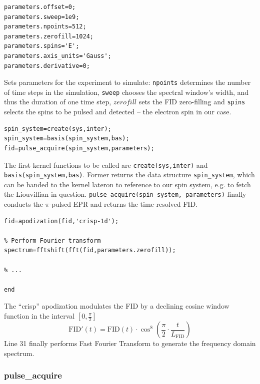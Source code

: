 \documentclass[11.5pt,a4paper]{article}
\begin{document}
\begin{lstlisting}[firstnumber=last]
% Set the sequence parameters
parameters.offset=0;
parameters.sweep=1e9;
parameters.npoints=512;
parameters.zerofill=1024;
parameters.spins='E';
parameters.axis_units='Gauss';
parameters.derivative=0;
\end{lstlisting}
Sets parameters for the experiment to simulate: \verb$npoints$ determines the number of time steps in the simulation, \verb$sweep$ chooses the spectral window's width, and thus the duration of one time step, $zerofill$ sets the FID zero-filling and \verb$spins$ selects the spins to be pulsed and detected -- the electron spin in our case.
\begin{lstlisting}[firstnumber=last]
% Run Spinach
spin_system=create(sys,inter);
spin_system=basis(spin_system,bas);
fid=pulse_acquire(spin_system,parameters);
\end{lstlisting}
The first kernel functions to be called are \verb$create(sys,inter)$ and \verb$basis(spin_system,bas)$. Former returns the data structure \verb$spin_system$, which can be handed to the kernel lateron to reference to our spin system, e.g. to fetch the Liouvillian in question.
\verb$pulse_acquire(spin_system, parameters)$ finally conducts the $\pi$-pulsed EPR and returns the time-resolved FID.
\begin{lstlisting}[firstnumber=last]
% Apodization
fid=apodization(fid,'crisp-1d');

% Perform Fourier transform
spectrum=fftshift(fft(fid,parameters.zerofill));

% ...

end
\end{lstlisting}
The ``crisp'' apodization modulates the FID by a declining cosine window function in the interval $[0,\tfrac{\pi}{2}]$
\begin{equation}
 \text{FID}'(t) = \text{FID}(t) \cdot \cos^8 \left( \frac{\pi}{2} \cdot \frac{t}{L_\text{FID}} \right)
\end{equation}
Line 31 finally performs Fast Fourier Transform to generate the frequency domain spectrum.

\subsubsection{pulse\_acquire}
\end{document}
